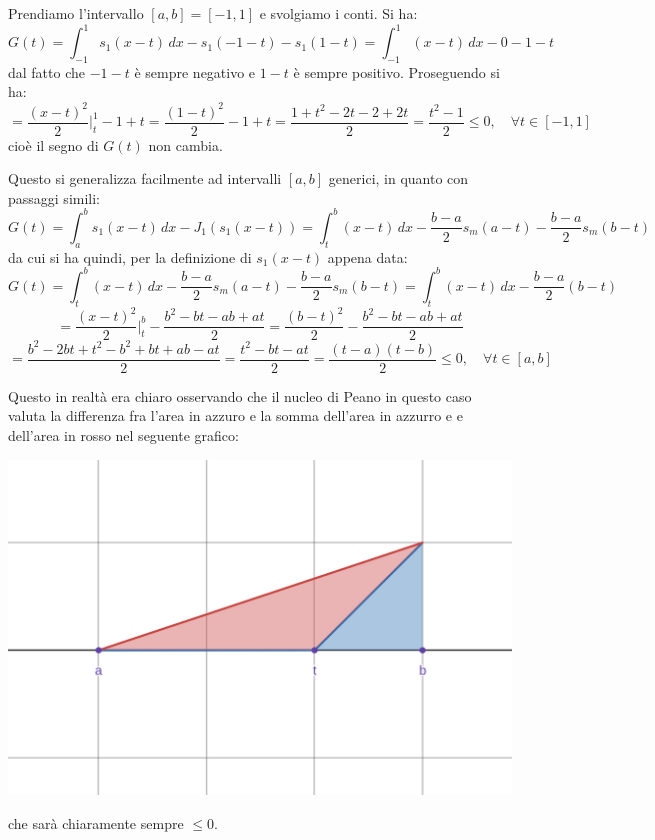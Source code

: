 \documentclass[a4paper,11pt]{article}
\begin{document}
\par\smallskip

Prendiamo l'intervallo $[a, b] = [-1, 1]$ e svolgiamo i conti.
Si ha:
$$
G(t) = \int_{-1}^1 s_1(x - t) \, dx - s_1(-1 - t) - s_1(1 - t)
= \int_{-1}^1 (x - t) \, dx - 0 - 1 - t
$$
dal fatto che $-1 - t$ è sempre negativo e $1 - t$ è sempre positivo.
Proseguendo si ha:
$$
= \frac{(x - t)^2}{2} \Big|_t^1 - 1 + t = \frac{(1 - t)^2}{2} - 1 + t 
= \frac{1 + t^2 - 2t- 2 + 2t}{2} = \frac{t^2 - 1}{2} \leq 0, \quad \forall t \in [-1, 1]
$$
cioè il segno di $G(t)$ non cambia.

\par\smallskip

Questo si generalizza facilmente ad intervalli $[a, b]$ generici, in quanto con passaggi simili:
$$
G(t) = \int_a^b s_1(x - t) \, dx - J_1 ( s_1(x - t) ) = \int_t^b (x - t) \, dx - \frac{b - a}{2} s_m (a - t) - \frac{b - a}{2} s_m(b - t)
$$
da cui si ha quindi, per la definizione di $s_1(x - t)$ appena data:
$$
G(t) = \int_t^b (x - t) \, dx - \frac{b - a}{2} s_m(a - t) - \frac{b - a}{2} s_m(b - t) = \int_t^b (x - t) \, dx - \frac{b - a}{2}(b - t) 
$$
$$
= \frac{(x - t)^2}{2} \Big|^b_t - \frac{b^2 - bt - ab + at}{2} = \frac{(b - t)^2}{2} - \frac{b^2 - bt - ab + at}{2} 
$$
$$
= \frac{b^2 - 2bt + t^2 - b^2 + bt + ab - at}{2} = \frac{t^2 - bt - at}{2} = \frac{(t - a)(t - b)}{2} \leq 0, \quad \forall t \in [a, b]
$$

\noindent
\begin{minipage}{\textwidth}

Questo in realtà era chiaro osservando che il nucleo di Peano in questo caso valuta la differenza fra l'area in azzuro e la somma dell'area in azzurro e e dell'area in rosso nel seguente grafico:
\begin{center}
	\includegraphics[scale=0.28]{../figures/peano_kernel.png}
\end{center}
che sarà chiaramente sempre $\leq 0$.

\end{minipage}
\end{document}
